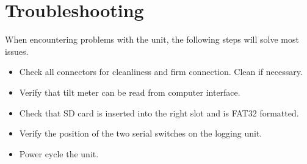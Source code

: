 \documentclass[11pt]{article} %
\begin{document}
\section{Troubleshooting}
When encountering problems with the unit, the following steps will solve most issues.

\begin{itemize}
\item Check all connectors for cleanliness and firm connection. Clean if necessary.
\item Verify that tilt meter can be read from computer interface.
\item Check that SD card is inserted into the right slot and is FAT32 formatted.
\item Verify the position of the two serial switches on the logging unit.
\item Power cycle the unit.
\end{itemize}
\end{document}
